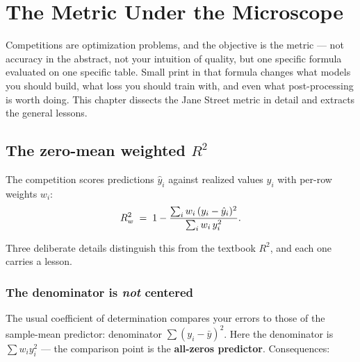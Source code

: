 \chapter{The Metric Under the Microscope}
\label{ch:metric}

Competitions are optimization problems, and the objective is the metric ---
not accuracy in the abstract, not your intuition of quality, but one specific
formula evaluated on one specific table. Small print in that formula changes
what models you should build, what loss you should train with, and even what
post-processing is worth doing. This chapter dissects the Jane Street metric
in detail and extracts the general lessons.

\section{The zero-mean weighted \texorpdfstring{$R^2$}{R2}}

The competition scores predictions $\hat y_i$ against realized values $y_i$
with per-row weights $w_i$:
\begin{equation}
R^2_{w} \;=\; 1 - \frac{\sum_i w_i\,(y_i - \hat y_i)^2}{\sum_i w_i\, y_i^2}.
\label{eq:wr2}
\end{equation}

Three deliberate details distinguish this from the textbook $R^2$, and each
one carries a lesson.

\subsection{The denominator is \emph{not} centered}

The usual coefficient of determination compares your errors to those of the
sample-mean predictor: denominator $\sum (y_i - \bar y)^2$. Here the
denominator is $\sum w_i y_i^2$ --- the comparison point is the
\textbf{all-zeros predictor}. Consequences:

